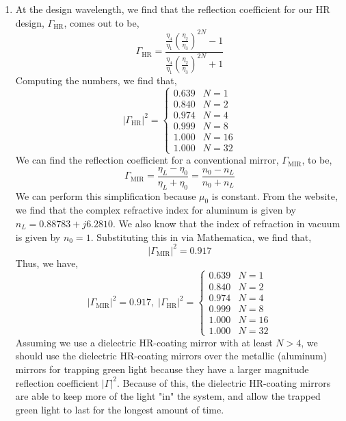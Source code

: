 \documentclass[12pt]{article}
\begin{document}
\begin{enumerate}
\begin{enumerate}
		\item [(c)]
		At the design wavelength, we find that the reflection coefficient for our HR design, $\Gamma_{\mathrm{HR}}$, comes out to be,
		\[\Gamma_{\mathrm{HR}} = \frac{\frac{\eta_4}{\eta_1}\left(\frac{\eta_2}{\eta_3}\right)^{2N}-1}{\frac{\eta_4}{\eta_1}\left(\frac{\eta_2}{\eta_3}\right)^{2N}+1}\]
		Computing the numbers, we find that,
		\[|\Gamma_{\mathrm{HR}}|^2=\begin{cases}
			0.639 & N = 1 \\ 
			0.840 & N=2 \\ 
			0.974 & N=4 \\ 
			0.999 & N=8 \\ 
			1.000 & N = 16 \\ 
			1.000 & N=32
		\end{cases}\]
		We can find the reflection coefficient for a conventional mirror, $\Gamma_{\mathrm{MIR}}$, to be,
		\[\Gamma_{\mathrm{MIR}}=\frac{\eta_L-\eta_0}{\eta_L+\eta_0}=\frac{n_0-n_L}{n_0+n_L}\]
		We can perform this simplification because $\mu_0$ is constant.
		From the website, we find that the complex refractive index for aluminum is given by $n_L=0.88783+j6.2810$.
		We also know that the index of refraction in vacuum is given by $n_0=1$.
		Substituting this in via Mathematica, we find that,
		\[|\Gamma_{\mathrm{MIR}}|^2 = 0.917\]
		Thus, we have,
		\[\boxed{|\Gamma_{\mathrm{MIR}}|^2 = 0.917, \; |\Gamma_{\mathrm{HR}}|^2=\begin{cases}
			0.639 & N = 1 \\ 
			0.840 & N=2 \\ 
			0.974 & N=4 \\ 
			0.999 & N=8 \\ 
			1.000 & N = 16 \\ 
			1.000 & N=32
		\end{cases}}\]
		Assuming we use a dielectric HR-coating mirror with at least $N>4$, we should use the dielectric HR-coating mirrors over the metallic (aluminum) mirrors for trapping green light because they have a larger magnitude reflection coefficient $|\Gamma|^2$.
		Because of this, the dielectric HR-coating mirrors are able to keep more of the light "in" the system, and allow the trapped green light to last for the longest amount of time.

	\end{enumerate}


\end{enumerate}
\end{document}
